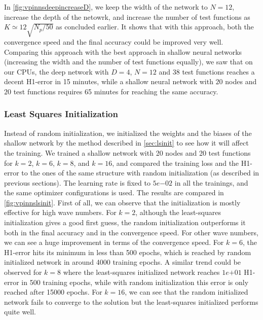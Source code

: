 In \autoref{fig:vpinnsdeepincreaseD}, we keep the width of the network to $N=12$, increase the depth of the netowrk, and increase the number of test functions as $K \simeq 12\sqrt{N_p/50}$ as concluded earlier. It shows that with this approach, both the convergence speed and the final accuracy could be improved very well. Comparing this approach with the best approach in shallow neural networks (increasing the width and the number of test functions equally), we saw that on our CPUs, the deep network with $D=4$, $N=12$ and 38 test functions reaches a decent H1-error in 15 minutes, while a shallow neural network with $20$ nodes and $20$ test functions requires 65 minutes for reaching the same accuracy.

\subsubsection{Least Squares Initialization} \label{sec:lsinitresults}
Instead of random initialization, we initialized the weights and the biases of the shallow network by the method described in \autoref{sec:lsinit} to see how it will affect the training. We trained a shallow network with 20 nodes and 20 test functions for $k=2$, $k=6$, $k=8$, and $k=16$, and compared the training loss and the H1-error to the ones of the same structure with random initialization (as described in previous sections). The learning rate is fixed to $5e{-02}$ in all the trainings, and the same optimizer configurations is used. The results are compared in \autoref{fig:vpinnslsinit}. First of all, we can observe that the initialization is mostly effective for high wave numbers. For $k=2$, although the least-squares initialization gives a good first guess, the random initialization outperforms it both in the final accuracy and in the convergence speed. For other wave numbers, we can see a huge improvement in terms of the convergence speed. For $k=6$, the H1-error hits its minimum in less than 500 epochs, which is reached by random initialized network in around 4000 training epochs. A similar trend could be observed for $k=8$ where the least-squares initialized network reaches $1e{+01}$ H1-error in 500 training epochs, while with random initialization this error is only reached after 15000 epochs. For $k=16$, we can see that the random initialized network fails to converge to the solution but the least-squares initialized performs quite well.

